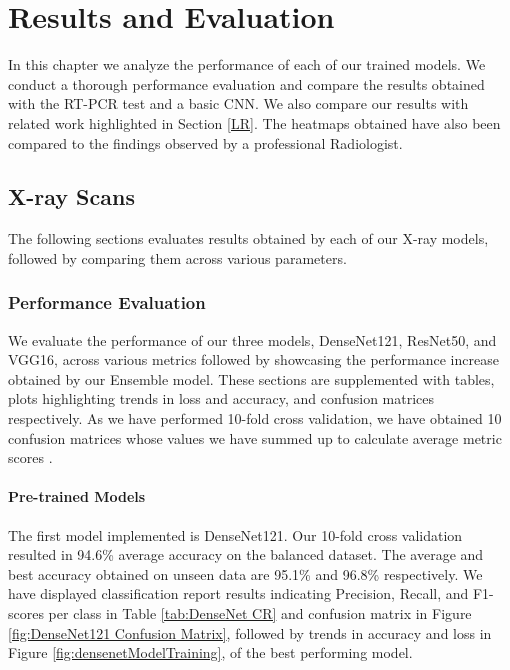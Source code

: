 \chapter{Results and Evaluation} \label{Results and Evaluation}

In this chapter we analyze the performance of each of our trained models. We conduct a thorough performance evaluation and compare the results obtained with the RT-PCR test and a basic CNN. We also compare our results with related work highlighted in Section \ref{LR}. The heatmaps obtained have also been compared to the findings observed by a professional Radiologist. 

\section{X-ray Scans}
The following sections evaluates results obtained by each of our X-ray models, followed by comparing them across various parameters.
\subsection{Performance Evaluation}
We evaluate the performance of our three models, DenseNet121, ResNet50, and VGG16, across various metrics followed by showcasing the performance increase obtained by our Ensemble model. These sections are supplemented with tables, plots highlighting trends in loss and accuracy, and confusion matrices respectively. As we have performed 10-fold cross validation, we have obtained 10 confusion matrices whose values we have summed up to calculate average metric scores \cite{RGC2016}.
\subsubsection{Pre-trained Models} \label{ptmXray}

The first model implemented is DenseNet121. Our 10-fold cross validation resulted in 94.6\% average accuracy on the balanced dataset. The average and best accuracy obtained on unseen data are 95.1\% and 96.8\% respectively. We have displayed classification report results indicating Precision, Recall, and F1-scores per class in Table \ref{tab:DenseNet CR} and confusion matrix in Figure \ref{fig:DenseNet121 Confusion Matrix},  followed by trends in accuracy and loss in Figure \ref{fig:densenetModelTraining}, of the best performing model.

